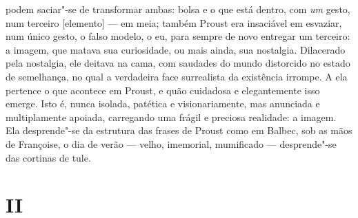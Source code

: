 podem saciar"-se de transformar ambas: bolsa e o que está dentro, com
\emph{um} gesto, num terceiro {[}elemento{]} --- em meia; também Proust
era insaciável em esvaziar, num único gesto, o falso modelo, o eu, para
sempre de novo entregar um terceiro: a imagem, que matava sua
curiosidade, ou mais ainda, sua nostalgia. Dilacerado pela nostalgia,
ele deitava na cama, com saudades do mundo distorcido no estado de
semelhança, no qual a verdadeira face surrealista da existência irrompe.
A ela pertence o que acontece em Proust, e quão cuidadosa e
elegantemente isso emerge. Isto é, nunca isolada, patética e
visionariamente, mas anunciada e multiplamente apoiada, carregando uma
frágil e preciosa realidade: a imagem. Ela desprende"-se da estrutura das
frases de Proust como em Balbec, sob as mãos de Françoise, o dia de
verão --- velho, imemorial, mumificado --- desprende"-se das cortinas de tule.

\section{II}

